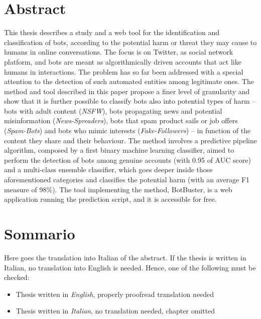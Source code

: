 
\newpage
\chapter*{Abstract}


This thesis describes a study and a web tool for the identification and classification of bots, according to the potential harm or threat they may cause to humans in online conversations. The focus is on Twitter, as social network platform, and bots are meant as algorithmically driven accounts that act like humans in interactions.
The problem has so far been addressed with a special attention to the detection of such automated entities among legitimate ones. The method and tool described in this paper propose a finer level of granularity and show that it is further possible to classify bots also into potential types of harm --  bots with adult content (\textit{NSFW}), bots propagating news and potential misinformation (\textit{News-Spreaders}), bots that spam product sails or job offers (\textit{Spam-Bots}) and bots who mimic interests (\textit{Fake-Followers}) -- in function of the content they share and their behaviour.
The method involves a predictive pipeline algorithm, composed by a first binary machine learning classifier, aimed to perform the detection of bots among genuine accounts (with 0.95 of AUC score) and a multi-class ensemble classifier, which goes deeper inside those aforementioned categories and classifies the potential harm (with an average F1 measure of 98\%).
The tool implementing the method, BotBuster, is a web application running the prediction script, and it is accessible for free.





\newpage
\chapter*{Sommario}


Here goes the translation into Italian of the abstract. If the thesis is written in Italian, no translation into English is needed. Hence, one of the following must be checked:

\begin{itemize}
\item[\Square] Thesis written in \emph{English}, properly proofread translation needed
\item[\Square] Thesis written in \emph{Italian}, no translation needed, chapter omitted
\end{itemize}
